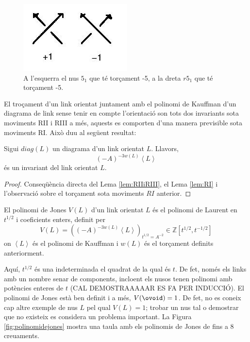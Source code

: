 \begin{figure}
	\centering
	\includegraphics[width=0.9\linewidth]{img/signe.jpg}
	\caption{A l'esquerra el nus $5_1$ que té torçament -5, a la dreta $r5_1$ que té torçament -5.}\label{fig:calculdelsigne}
\end{figure}

El troçament d'un link orientat juntament amb el polinomi de Kauffman d'un diagrama de link sense tenir en compte l'orientació son tots dos invariants sota moviments RII i RIII a més, aquests es comporten d'una manera previsible sota moviments RI. Això duu al següent resultat:

\begin{theorem}
	Sigui $diag(L)$ un diagrama d'un link orientat $L$. Llavors, $$(-A)^{-3w(L)}\left\langle L\right\rangle$$ és un invariant del link orientat $L$.
\end{theorem}

\begin{proof}
	Conseqüència directa del Lema \ref{lem:RIIiRIII}, el Lema \ref{lem:RI} i l'observació sobre el torçament sota moviments $RI$ anterior.
\end{proof}

\begin{definition}\label{def:polinomidejones}
	El polinomi de Jones $V(L)$ d'un link orientat $L$ és el polinomi de Laurent en $t^{1/2}$ i coeficients enters, definit per $$V(L)=\left((-A)^{-3w(L)}\left\langle L\right\rangle\right)_{t^{1/2}=A^{-2}}\in\mathbb{Z}[t^{1/2},t^{-1/2}]$$ on $\left\langle L\right\rangle$ és el polinomi de Kauffman i $w(L)$ és el torçament definits anteriorment.
\end{definition}

Aquí, $t^{1/2}$ és una indeterminada el quadrat de la qual és $t$. De fet, només els links amb un nombre senar de components, incloent els nusos tenen polinomi amb potències enteres de $t$ (CAL DEMOSTRAAAAAR ES FA PER INDUCCIÓ). El polinomi de Jones està ben definit i a més, $V(\ovoid)=1$. De fet, no es coneix cap altre exemple de nus $L$ pel qual $V(L)=1$; trobar un nus tal o demostrar que no existeix es considera un problema important. La Figura \ref{fig:polinomidejones} mostra una taula amb els polinomis de Jones de fins a 8 creuaments.\\

